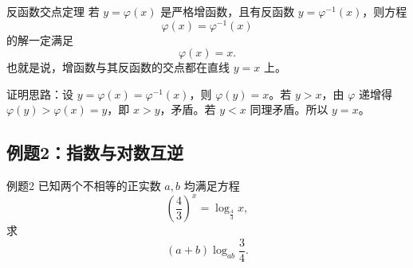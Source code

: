 \documentclass[11pt,a4paper]{ctexart}
\begin{document}
\begin{keybox}{反函数交点定理}
若 $y=\varphi(x)$ 是严格增函数，且有反函数 $y=\varphi^{-1}(x)$，则方程
\[
\varphi(x)=\varphi^{-1}(x)
\]
的解一定满足
\[
\boxed{\varphi(x)=x}.
\]
也就是说，增函数与其反函数的交点都在直线 $y=x$ 上。
\end{keybox}

\begin{graynote}
证明思路：设 $y=\varphi(x)=\varphi^{-1}(x)$，则 $\varphi(y)=x$。若 $y>x$，由 $\varphi$ 递增得 $\varphi(y)>\varphi(x)=y$，即 $x>y$，矛盾。若 $y<x$ 同理矛盾。所以 $y=x$。
\end{graynote}

\subsection{例题2：指数与对数互逆}

\begin{exbox}{例题2}
已知两个不相等的正实数 $a,b$ 均满足方程
\[
\left(\frac43\right)^x=\log_{\frac43}x,
\]
求
\[
(a+b)\log_{ab}\frac34.
\]
\end{exbox}
\end{document}
